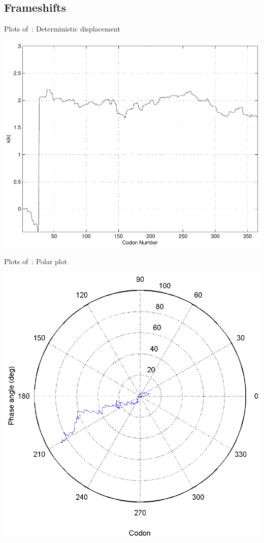 \documentclass[11pt]{article}
\begin{document}
\subsection{Frameshifts}
\label{section:frameshifts}

\begin{cfigure}
  \parbox{0.4\linewidth}{
    \caption{Plots of~\prfB: Deterministic displacement}
    \label{prfB:deterministic:sub}
    \includegraphics[width=\linewidth]{prfB/deterministic}
  }
  \qquad
  \begin{minipage}{0.4\linewidth}
    \caption{Plots of~\prfB: Polar plot}
    \label{prfB:polar:sub}
    \includegraphics[width=\linewidth]{prfB/polar}
  \end{minipage}
\end{cfigure}
\end{document}
